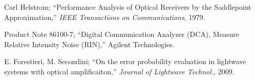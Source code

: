 \documentclass[a4paper]{article}
\begin{document}
\begin{thebibliography}{9}
	
	 Carl Helstrom; ``Performance Analysis of Optical Receivers by the Saddlepoint Approximation,'' \emph{IEEE Transactions on Communications}, 1979.
		
	 Product Note 86100-7; ``Digital Communication Analyzer (DCA), Measure Relative Intensity Noise (RIN),'' Agilent Technologies. 
	
	 E. Forestieri, M. Secondini; ``On the error probability evaluation in lightwave systems with optical amplificaiton,'' \emph{Journal of Lightwave Technol.}, 2009.
	
\end{thebibliography}
\end{document}
